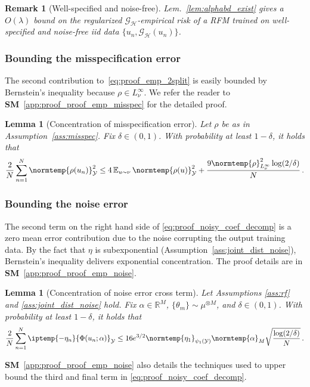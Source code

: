 \documentclass{article}
\theoremstyle{plain}
\newtheorem{lemma}[theorem]{Lemma}
\theoremstyle{my_def}
\theoremstyle{my_rem}
\newtheorem{remark}[theorem]{Remark}
\numberwithin{equation}{section}
\numberwithin{theorem}{section}%
\newcommand{\R}{\mathbb{R}}
\newcommand{\E}{\mathbb{E}}
\newcommand{\cG}{\mathcal{G}}
\newcommand{\cH}{\mathcal{H}}
\newcommand{\cY}{\mathcal{Y}}
\newcommand{\ip}{\iptemp}
\newcommand{\norm}{\normtemp}
\renewcommand{\E}{\operatorname{\mathbb{E}}} %
\newcommand{\al}{\alpha}
\newcommand{\Th}{{\{\theta_m\}}}
\newcommand{\GH}{\cG_{\cH}}
\begin{document}
\begin{remark}[Well-specified and noise-free]
    Lem.~\ref{lem:alphabd_exist} gives a $O(\lambda)$ bound on the regularized $\GH$-empirical risk of a RFM trained on well-specified and noise-free iid data $\{u_n, \GH(u_n)\}$.
\end{remark}

\subsubsection{Bounding the misspecification error}\label{sec:proof_emp_misspec}
The second contribution to~\eqref{eq:proof_emp_2split} is easily bounded by Bernstein's inequality because $\rho\in L^\infty_\nu$. We refer the reader to {\bf SM}~\ref{app:proof_proof_emp_misspec} for the detailed proof.
\begin{lemma}[Concentration of misspecification error]\label{lem:app_misspec_con}
    Let $\rho$ be as in Assumption~\ref{ass:misspec}. Fix $\delta\in(0,1)$. With probability at least $1-\delta$, it holds that
    \begin{equation}
        \frac{2}{N}\sum_{n=1}^N\norm{\rho(u_n)}_\cY^2 \leq 4 \E_{u\sim\nu} \norm{\rho(u)}_{\cY}^2 + \frac{9\norm{\rho}_{L^\infty_\nu}^2\log(2/\delta)}{N}\,.
    \end{equation}
\end{lemma}

\subsubsection{Bounding the noise error}\label{sec:proof_emp_noise}
The second term on the right hand side of \eqref{eq:proof_noisy_coef_decomp} is a zero mean error contribution due to the noise corrupting the output training data. By the fact that $\eta$ is subexponential (Assumption~\ref{ass:joint_dist_noise}), Bernstein's inequality delivers exponential concentration. The proof details are in {\bf SM}~\ref{app:proof_proof_emp_noise}.
\begin{lemma}[Concentration of noise error cross term]\label{lem:app_noise_sup_cross}
    Let Assumptions \ref{ass:rf} and \ref{ass:joint_dist_noise} hold. Fix $\alpha\in\R^M$, $\Th\sim\mu^{\otimes M}$, and $\delta\in(0,1)$. With probability at least $1-\delta$, it holds that
    \begin{equation}
        \frac{2}{N}\sum_{n=1}^N\ip{-\eta_n}{\Phi(u_n;\alpha)}_\cY\leq 16e^{3/2}\norm{\eta_1}_{\psi_1(\cY)}\norm{\al}_M \sqrt{\frac{\log(2/\delta)}{N}}\,.
    \end{equation}
\end{lemma}
{\bf SM}~\ref{app:proof_proof_emp_noise} also details the techniques used to upper bound the third and final term in \eqref{eq:proof_noisy_coef_decomp}.
\end{document}
